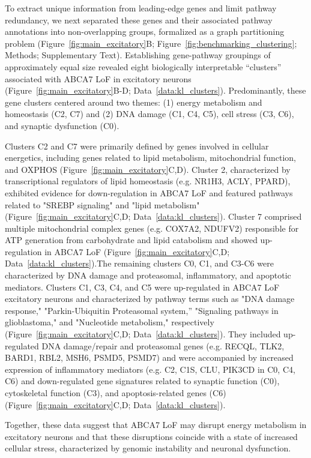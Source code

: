 To extract unique information from leading-edge genes and limit pathway redundancy, we next separated these genes and their associated pathway annotations into non-overlapping groups, formalized as a graph partitioning problem (Figure~\ref{fig:main_excitatory}B; Figure~\ref{fig:benchmarking_clustering}; Methods; Supplementary Text). Establishing gene-pathway groupings of approximately equal size revealed eight biologically interpretable “clusters” associated with ABCA7 LoF in excitatory neurons (Figure~\ref{fig:main_excitatory}B-D; Data~\ref{data:kl_clusters}). Predominantly, these gene clusters centered around two themes: (1) energy metabolism and homeostasis (C2, C7) and (2) DNA damage (C1, C4, C5), cell stress (C3, C6), and synaptic dysfunction (C0).

Clusters C2 and C7 were primarily defined by genes involved in cellular energetics, including genes related to lipid metabolism, mitochondrial function, and  OXPHOS (Figure~\ref{fig:main_excitatory}C,D). Cluster 2, characterized by transcriptional regulators of lipid homeostasis (e.g. NR1H3, ACLY, PPARD), exhibited evidence for down-regulation in ABCA7 LoF and featured pathways related to "SREBP signaling" and "lipid metabolism" (Figure~\ref{fig:main_excitatory}C,D; Data~\ref{data:kl_clusters}). Cluster 7 comprised multiple mitochondrial complex genes (e.g. COX7A2, NDUFV2) responsible for ATP generation from carbohydrate and lipid catabolism and showed up-regulation in ABCA7 LoF (Figure~\ref{fig:main_excitatory}C,D; Data~\ref{data:kl_clusters}).The remaining clusters C0, C1, and C3-C6 were characterized by DNA damage and proteasomal, inflammatory, and apoptotic mediators. Clusters C1, C3, C4, and C5 were up-regulated in ABCA7 LoF excitatory neurons and characterized by pathway terms such as "DNA damage response," "Parkin-Ubiquitin Proteasomal system,” "Signaling pathways in glioblastoma," and "Nucleotide metabolism," respectively (Figure~\ref{fig:main_excitatory}C,D; Data~\ref{data:kl_clusters}). They included up-regulated DNA damage/repair and proteasomal genes (e.g. RECQL, TLK2, BARD1, RBL2, MSH6, PSMD5, PSMD7) and were accompanied by increased expression of inflammatory mediators (e.g. C2, C1S, CLU, PIK3CD in C0, C4, C6) and down-regulated gene signatures related to synaptic function (C0), cytoskeletal function (C3), and apoptosis-related genes (C6) (Figure~\ref{fig:main_excitatory}C,D; Data~\ref{data:kl_clusters}). 

Together, these data suggest that ABCA7 LoF may disrupt energy metabolism in excitatory neurons and that these disruptions coincide with a state of increased cellular stress, characterized by genomic instability and neuronal dysfunction.

